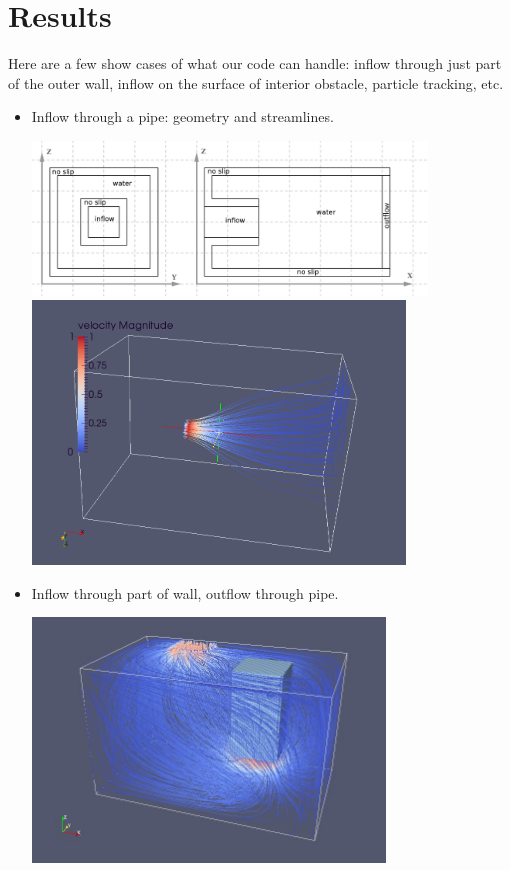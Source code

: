 \documentclass[a4paper, 12pt]{article}
\begin{document}
\section{Results}\label{sec:results}
Here are a few show cases of what our code can handle: inflow through just part of the outer wall, inflow on the surface of interior obstacle, 
particle tracking, etc.
\newpage
\begin{itemize}
\item Inflow through a pipe: geometry and streamlines.
\begin{center}
\includegraphics[height=4.1cm]{pipeinflow.png}\\
\includegraphics[height=7cm]{pipeinflw.png}
\end{center}

\item Inflow through part of wall, outflow through pipe.
\begin{center}
\includegraphics[height=6.5cm]{inoutpipe.jpg}
\end{center}


\end{itemize}
\end{document}

